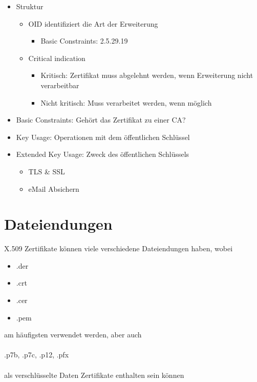   \begin{itemize}
      \item Struktur
            \begin{itemize}
                \item OID identifiziert die Art der Erweiterung
                    \begin{itemize}
                        \item Basic Constraints: 2.5.29.19
                    \end{itemize}
                \item Critical indication
                    \begin{itemize}
                        \item Kritisch: Zertifikat muss abgelehnt werden, wenn Erweiterung nicht verarbeitbar
                        \item Nicht kritisch: Muss verarbeitet werden, wenn möglich
                    \end{itemize}
            \end{itemize}
  \end{itemize}



    



    \begin{itemize}
        \item Basic Constraints: Gehört das Zertifikat zu einer CA?
        \item Key Usage: Operationen mit dem öffentlichen Schlüssel
        \item Extended Key Usage: Zweck des öffentlichen Schlüssels
            \begin{itemize}
                \item TLS \& SSL
                \item eMail Absichern
            \end{itemize}
    \end{itemize}


\section{Dateiendungen}

X.509 Zertifikate können viele verschiedene Dateiendungen haben, wobei
\begin{itemize}
\item .der
\item .crt
\item .cer
\item .pem
\end{itemize}

am häufigsten verwendet werden, aber auch 
\\\\
.p7b, .p7c, .p12, .pfx
\\\\
als verschlüsselte Daten Zertifikate enthalten sein können

